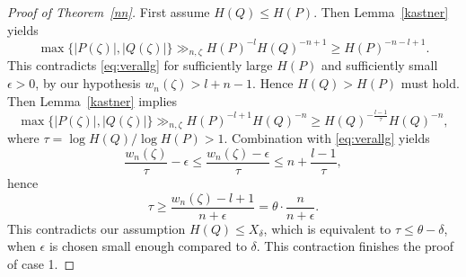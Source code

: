 \documentclass[12pt]{amsart}
\theoremstyle{definition}
\begin{document}
\begin{proof} [Proof of Theorem~\ref{nn}]
First assume $H(Q)\leq H(P)$. Then Lemma~\ref{kastner} yields
\[
\max \{ \vert P(\zeta)\vert, \vert Q(\zeta)\vert \} \gg_{n,\zeta} H(P)^{-l} H(Q)^{-n+1}\geq H(P)^{-n-l+1}.
\]
This contradicts \eqref{eq:verallg} for sufficiently large $H(P)$ and sufficiently small $\epsilon>0$,
by our hypothesis $w_{n}(\zeta)>l+n-1$. Hence $H(Q)>H(P)$ must hold.
Then Lemma~\ref{kastner} implies
\[
\max \{ \vert P(\zeta)\vert, \vert Q(\zeta)\vert \} \gg_{n,\zeta} H(P)^{-l+1}H(Q)^{-n} 
\geq H(Q)^{-\frac{l-1}{\tau}} H(Q)^{-n},
\]
where $\tau= \log H(Q)/ \log H(P)>1$. Combination with \eqref{eq:verallg} yields
\[
\frac{w_{n}(\zeta)}{\tau}-\epsilon\leq 
\frac{w_{n}(\zeta)-\epsilon}{\tau}\leq n+\frac{l-1}{\tau},
\]
hence
\[
\tau \geq \frac{w_{n}(\zeta)-l+1}{n+\epsilon}=\theta\cdot \frac{n}{n+\epsilon}.
\]
This contradicts our assumption $H(Q)\leq X_{\delta}$, which is equivalent to $\tau\leq \theta-\delta$, when $\epsilon$ is 
chosen small enough compared to $\delta$. This contraction finishes the proof of case 1.


\end{proof}
\end{document}
